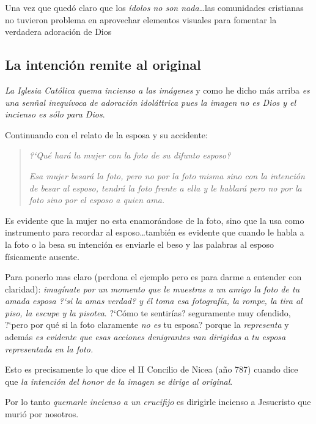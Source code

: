 \documentclass{article}
\begin{document}
Una vez que qued\'o claro que los \emph{\'{i}dolos no son nada}\ldots las comunidades cristianas no tuvieron problema en aprovechar elementos visuales para fomentar la verdadera adoraci\'on de Dios

\subsection{La intenci\'on remite al original}

\emph{La Iglesia Cat\'olica quema incienso a las im\'agenes} y como he dicho m\'as arriba \emph{es una sen\~nal inequ\'ivoca de adoraci\'on idol\'attrica pues la imagen no es Dios y el incienso es s\'olo para Dios}.

Continuando con el relato de la esposa y su accidente:

\begin{quote}
\emph{?`Qu\'e har\'a la mujer con la foto de su difunto esposo?}

\emph{Esa mujer besar\'a la foto, pero no por la foto misma sino con la intenci\'on de besar al esposo, tendr\'a la foto frente a ella y le hablar\'a pero no por la foto sino por el esposo a quien ama.}
\end{quote}

\noindent
Es evidente que la mujer no esta enamor\'andose de la foto, sino que la usa como instrumento para recordar al esposo\ldots tambi\'en es evidente que cuando le habla a la foto o la besa su intenci\'on es enviarle el beso y las palabras al esposo f\'{i}sicamente ausente.

Para ponerlo mas claro (perdona el ejemplo pero es para darme a entender con claridad): \emph{imag\'{i}nate por un momento que le muestras a un amigo la foto de tu amada esposa ?`si la amas verdad? y \'el toma esa fotograf\'{i}a, la rompe, la tira al piso, la escupe y la pisotea}. ?`C\'omo te sentir\'{i}as? seguramente muy ofendido, ?`pero por qu\'e si la foto claramente \emph{no es} tu esposa? porque la \emph{representa} y adem\'as \emph{es evidente que esas acciones denigrantes van dirigidas a tu esposa representada en la foto.}

Esto es precisamente lo que dice el II Concilio de Nicea (a\~no 787) cuando dice que \emph{la intenci\'on del honor de la imagen se dirige al original}.

Por lo tanto \emph{quemarle incienso a un crucifijo} es dirigirle incienso a Jesucristo que muri\'o por nosotros.

\end{document}
